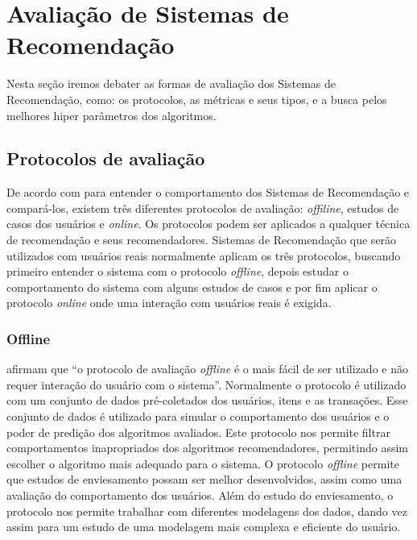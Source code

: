 \section{Avaliação de Sistemas de Recomendação}
\label{sec:recommendation_system_metrics}
Nesta seção iremos debater as formas de avaliação dos Sistemas de Recomendação, como: os protocolos, as métricas e seus tipos, e a busca pelos melhores hiper parâmetros dos algoritmos.

\subsection{Protocolos de avaliação}
De acordo com  para entender o comportamento dos Sistemas de Recomendação e compará-los, existem três diferentes protocolos de avaliação: \textit{offiline}, estudos de casos dos usuários e \textit{online}. Os protocolos podem ser aplicados a qualquer técnica de recomendação e seus recomendadores. Sistemas de Recomendação que serão utilizados com usuários reais normalmente aplicam os três protocolos, buscando primeiro entender o sistema com o protocolo \textit{offline}, depois estudar o comportamento do sistema com alguns estudos de casos e por fim aplicar o protocolo \textit{online} onde uma interação com usuários reais é exigida.

\subsubsection{Offline}
 afirmam que ``o protocolo de avaliação \textit{offline} é o mais fácil de ser utilizado e não requer interação do usuário com o sistema''. Normalmente o protocolo é utilizado com um conjunto de dados pré-coletados dos usuários, itens e as transações. Esse conjunto de dados é utilizado para simular o comportamento dos usuários e o poder de predição dos algoritmos avaliados. Este protocolo nos permite filtrar comportamentos inapropriados dos algoritmos recomendadores, permitindo assim escolher o algoritmo mais adequado para o sistema. O protocolo \textit{offline} permite que estudos de enviesamento possam ser melhor desenvolvidos, assim como uma avaliação do comportamento dos usuários. Além do estudo do enviesamento, o protocolo nos permite trabalhar com diferentes modelagens dos dados, dando vez assim para um estudo de uma modelagem mais complexa e eficiente do usuário.


